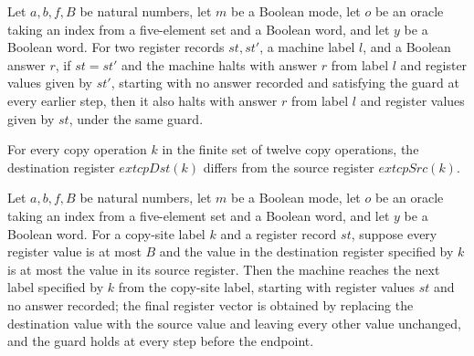 \begin{lemma}
\label{Complexity.PathHard.contH}
\leanok
{}
Let $a,b,f,B$ be natural numbers, let $m$ be a Boolean mode, let $o$ be an oracle taking
an index from a five-element set and a Boolean word, and let $y$ be a Boolean word. For
two register records $st,st'$, a machine label $l$, and a Boolean answer $r$, if
$st=st'$ and the machine halts with answer $r$ from label $l$ and register values given
by $st'$, starting with no answer recorded and satisfying the guard at every earlier
step, then it also halts with answer $r$ from label $l$ and register values given by
$st$, under the same guard.
\end{lemma}

\begin{lemma}
\label{Complexity.PathHard.cp_ne}
\leanok
{}
For every copy operation $k$ in the finite set of twelve copy operations, the
destination register $	ext{cpDst}(k)$ differs from the source register $	ext{cpSrc}(k)$.
\end{lemma}

\begin{theorem}
\label{Complexity.PathHard.cp_run}
\leanok
{}
Let $a,b,f,B$ be natural numbers, let $m$ be a Boolean mode, let $o$ be an oracle taking
an index from a five-element set and a Boolean word, and let $y$ be a Boolean word. For
a copy-site label $k$ and a register record $st$, suppose every register value is at
most $B$ and the value in the destination register specified by $k$ is at most the value
in its source register. Then the machine reaches the next label specified by $k$ from
the copy-site label, starting with register values $st$ and no answer recorded; the
final register vector is obtained by replacing the destination value with the source
value and leaving every other value unchanged, and the guard holds at every step before
the endpoint.
\end{theorem}

